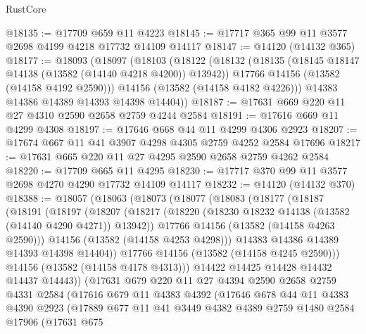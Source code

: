 \begin{lexlean}{RustCore}
\begin{coremodule}
@18135 := @17709 @659 @11 @4223
@18145 := @17717 @365 @99 @11 @3577 @2698 @4199 @4218 @17732 @14109 @14117
@18147 := @14120 (@14132 @365)
@18177 := @18093
    (@18097
      (@18103
        (@18122
          (@18132
            (@18135 (@18145 @18147 @14138 (@13582 (@14140 @4218 @4200)) @13942))
            @17766
            @14156
            (@13582 (@14158 @4192 @2590)))
          @14156
          (@13582 (@14158 @4182 @4226)))
        @14383
        @14386
        @14389
        @14393
        @14398
        @14404))
@18187 := @17631 @669 @220 @11 @27 @4310 @2590 @2658 @2759 @4244 @2584
@18191 := @17616 @669 @11 @4299 @4308
@18197 := @17646 @668 @44 @11 @4299 @4306 @2923
@18207 := @17674 @667 @11 @41 @3907 @4298 @4305 @2759 @4252 @2584 @17696
@18217 := @17631 @665 @220 @11 @27 @4295 @2590 @2658 @2759 @4262 @2584
@18220 := @17709 @665 @11 @4295
@18230 := @17717 @370 @99 @11 @3577 @2698 @4270 @4290 @17732 @14109 @14117
@18232 := @14120 (@14132 @370)
@18388 := @18057
    (@18063
      (@18073
        (@18077
          (@18083
            (@18177
              (@18187
                (@18191
                  (@18197
                    (@18207
                      (@18217
                        (@18220 (@18230 @18232 @14138 (@13582 (@14140 @4290 @4271)) @13942))
                        @17766
                        @14156
                        (@13582 (@14158 @4263 @2590)))
                      @14156
                      (@13582 (@14158 @4253 @4298)))
                    @14383
                    @14386
                    @14389
                    @14393
                    @14398
                    @14404))
                @17766
                @14156
                (@13582 (@14158 @4245 @2590)))
              @14156
              (@13582 (@14158 @4178 @4313)))
            @14422
            @14425
            @14428
            @14432
            @14437
            @14443))
        (@17631
          @679
          @220
          @11
          @27
          @4394
          @2590
          @2658
          @2759
          @4331
          @2584
          (@17616
            @679
            @11
            @4383
            @4392
            (@17646
              @678
              @44
              @11
              @4383
              @4390
              @2923
              (@17889
                @677
                @11
                @41
                @3449
                @4382
                @4389
                @2759
                @1480
                @2584
                @17906
                (@17631
                  @675

\end{coremodule}
\end{lexlean}
